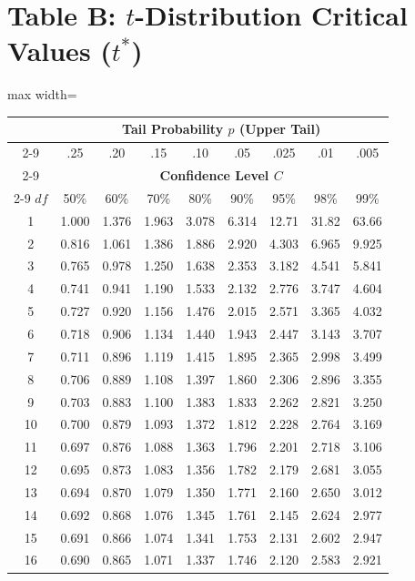 \clearpage
\section{Table B: $t$-Distribution Critical Values ($t^*$)}
\begin{center}
\small
\begin{adjustbox}{max width=\linewidth}
\begin{tabular}{ccccccccc}
\toprule
& \multicolumn{8}{c}{\textbf{Tail Probability $p$ (Upper Tail)}} \\
\cmidrule(lr){2-9}
& .25 & .20 & .15 & .10 & .05 & .025 & .01 & .005 \\
\cmidrule(lr){2-9}
& \multicolumn{8}{c}{\textbf{Confidence Level $C$}} \\
\cmidrule(lr){2-9}
$df$ & 50\% & 60\% & 70\% & 80\% & 90\% & 95\% & 98\% & 99\% \\
\midrule
1 & 1.000 & 1.376 & 1.963 & 3.078 & 6.314 & 12.71 & 31.82 & 63.66 \\
2 & 0.816 & 1.061 & 1.386 & 1.886 & 2.920 & 4.303 & 6.965 & 9.925 \\
3 & 0.765 & 0.978 & 1.250 & 1.638 & 2.353 & 3.182 & 4.541 & 5.841 \\
4 & 0.741 & 0.941 & 1.190 & 1.533 & 2.132 & 2.776 & 3.747 & 4.604 \\
5 & 0.727 & 0.920 & 1.156 & 1.476 & 2.015 & 2.571 & 3.365 & 4.032 \\
\midrule
6 & 0.718 & 0.906 & 1.134 & 1.440 & 1.943 & 2.447 & 3.143 & 3.707 \\
7 & 0.711 & 0.896 & 1.119 & 1.415 & 1.895 & 2.365 & 2.998 & 3.499 \\
8 & 0.706 & 0.889 & 1.108 & 1.397 & 1.860 & 2.306 & 2.896 & 3.355 \\
9 & 0.703 & 0.883 & 1.100 & 1.383 & 1.833 & 2.262 & 2.821 & 3.250 \\
10 & 0.700 & 0.879 & 1.093 & 1.372 & 1.812 & 2.228 & 2.764 & 3.169 \\
\midrule
11 & 0.697 & 0.876 & 1.088 & 1.363 & 1.796 & 2.201 & 2.718 & 3.106 \\
12 & 0.695 & 0.873 & 1.083 & 1.356 & 1.782 & 2.179 & 2.681 & 3.055 \\
13 & 0.694 & 0.870 & 1.079 & 1.350 & 1.771 & 2.160 & 2.650 & 3.012 \\
14 & 0.692 & 0.868 & 1.076 & 1.345 & 1.761 & 2.145 & 2.624 & 2.977 \\
15 & 0.691 & 0.866 & 1.074 & 1.341 & 1.753 & 2.131 & 2.602 & 2.947 \\
\midrule
16 & 0.690 & 0.865 & 1.071 & 1.337 & 1.746 & 2.120 & 2.583 & 2.921 \\

\end{tabular}
\end{adjustbox}
\end{center}

